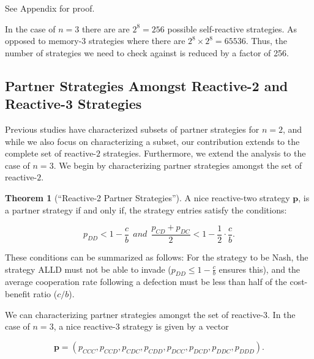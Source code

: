 \documentclass{article}
\theoremstyle{definition}
\newtheorem{theorem}{Theorem}[section]
\begin{document}
See Appendix for proof.

In the case of $n=3$ there are are $2^8 = 256$ possible self-reactive strategies.
As opposed to memory-3 strategies where there are $2^8 \times 2^8 = 65536$. Thus,
the number of strategies we need to check against is reduced by a factor of 256.

\subsection{Partner Strategies Amongst Reactive-2 and Reactive-3 Strategies}

Previous studies have characterized subsets of partner strategies for $n = 2$,
and while we also focus on characterizing a subset, our contribution extends to
the complete set of reactive-$2$ strategies. Furthermore, we extend the analysis
to the case of $n = 3$. We begin by characterizing partner strategies amongst
the set of reactive-$2$.

\begin{theorem}[``Reactive-2 Partner Strategies'']\label{theorem:reactive_two_partner_strategies}
A nice reactive-two strategy $\mathbf{p}$, is a partner strategy if and only if,
the strategy entries satisfy the conditions:

\begin{equation}\label{eq:two_bit_conditions}
  \displaystyle p_{DD} < 1\!-\! \frac{c}{b}  ~~and~~ \displaystyle \frac{p_{CD} + p_{DC}}{2} < 1- \frac{1}{2} \cdot \frac{c}{b}.
\end{equation}
\end{theorem}

These conditions can be summarized as follows: For the strategy to be Nash, the
strategy ALLD must not be able to invade ($p_{DD} \leq 1 - \frac{c}{b}$
ensures this), and the average cooperation rate following a defection must be
less than half of the cost-benefit ratio ($c/b$).

We can characterizing partner strategies amongst
the set of reactive-$3$. In the case of $n=3$, a nice reactive-3 strategy is
given by a vector

$$\mathbf{p}=(p_{CCC}, p_{CCD}, p_{CDC}, p_{CDD}, p_{DCC}, p_{DCD}, p_{DDC}, p_{DDD}).$$
\end{document}
